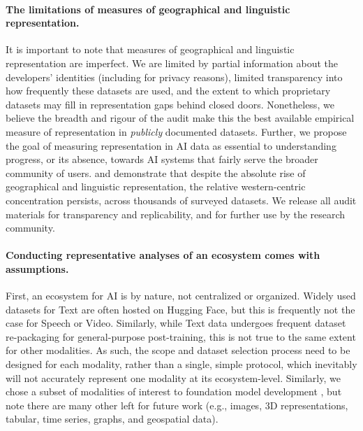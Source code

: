 \vspace{-2mm}
\paragraph{The limitations of measures of geographical and linguistic representation.}
It is important to note that measures of geographical and linguistic representation are imperfect. We are limited by partial information about the developers' identities (including for privacy reasons), limited transparency into how frequently these datasets are used, and the extent to which proprietary datasets may fill in representation gaps behind closed doors.
Nonetheless, we believe the breadth and rigour of the audit make this the best available empirical measure of representation in \emph{publicly} documented datasets.
Further, we propose the goal of measuring representation in AI data as essential to understanding progress, or its absence, towards AI systems that fairly serve the broader community of users.
 and  demonstrate that despite the absolute rise of geographical and linguistic representation, the relative western-centric concentration persists, across thousands of surveyed datasets.
We release all audit materials for transparency and replicability, and for further use by the research community.

\vspace{-2mm}
\paragraph{Conducting representative analyses of an ecosystem comes with assumptions.}
First, an ecosystem for AI is by nature, not centralized or organized.
Widely used datasets for Text are often hosted on Hugging Face, but this is frequently not the case for Speech or Video.
Similarly, while Text data undergoes frequent dataset re-packaging for general-purpose post-training, this is not true to the same extent for other modalities.
As such, the scope and dataset selection process need to be designed for each modality, rather than a single, simple protocol, which inevitably will not accurately represent one modality at its ecosystem-level.
Similarly, we chose a subset of modalities of interest to foundation model development \citep{sora2024, radford2023robust}, but note there are many other left for future work (e.g., images, 3D representations, tabular, time series, graphs, and geospatial data).